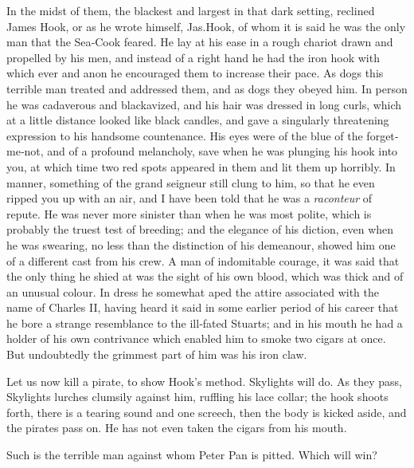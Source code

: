 In the midst of them, the blackest and largest in that dark setting,
reclined James Hook, or as he wrote himself, Jas.\@ Hook,
of whom it is said he was the only man that the Sea‐Cook feared.
He lay at his ease in a rough chariot drawn and propelled by his men,
and instead of a right hand he had the iron hook
with which ever and anon he encouraged them to increase their pace.
As dogs this terrible man treated and addressed them, and as dogs they obeyed him.
In person he was cadaverous and blackavized,
and his hair was dressed in long curls, which at a little distance looked like black candles,
and gave a singularly threatening expression to his handsome countenance.
His eyes were of the blue of the forget‐me‐not, and of a profound melancholy,
save when he was plunging his hook into you, at which time two red spots appeared in them and lit them up horribly.
In manner, something of the grand seigneur still clung to him,
so that he even ripped you up with an air,
and I have been told that he was a \emph{raconteur} of repute.
He was never more sinister than when he was most polite,
which is probably the truest test of breeding;
and the elegance of his diction, even when he was swearing, no less than the distinction of his demeanour,
showed him one of a different cast from his crew.
A man of indomitable courage, it was said that the only thing he shied at was the sight of his own blood,
which was thick and of an unusual colour.
In dress he somewhat aped the attire associated with the name of Charles II,
having heard it said in some earlier period of his career that he bore a strange resemblance to the ill‐fated Stuarts;
and in his mouth he had a holder of his own contrivance which enabled him to smoke two cigars at once.
But undoubtedly the grimmest part of him was his iron claw.

Let us now kill a pirate, to show Hook’s method.
Skylights will do.
As they pass, Skylights lurches clumsily against him, ruffling his lace collar;
the hook shoots forth, there is a tearing sound and one screech,
then the body is kicked aside, and the pirates pass on.
He has not even taken the cigars from his mouth.

Such is the terrible man against whom Peter Pan is pitted.
Which will win?

